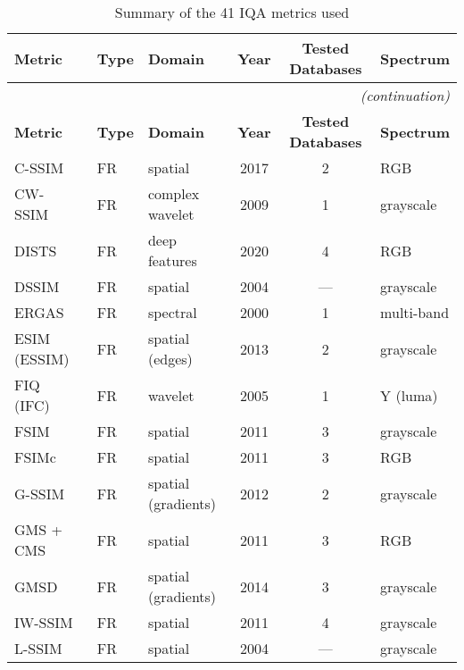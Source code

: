 \begin{longtable}{l l l c c l}
    \caption{Summary of the 41 IQA metrics used}\label{tab:fr_iqa_metrics}\\
    \hline
    \textbf{Metric} & \textbf{Type} & \textbf{Domain} & \textbf{Year} & \textbf{Tested Databases} & \textbf{Spectrum}\\
    \hline
    \endfirsthead
    \multicolumn{6}{r}{\small\itshape(continuation)}\\
    \hline
    \textbf{Metric} & \textbf{Type} & \textbf{Domain} & \textbf{Year} & \textbf{Tested Databases} & \textbf{Spectrum}\\
    \hline
    \endhead
    \hline
    \endfoot
    
    C-SSIM~\cite{Hassan2017CSSIM}          & FR   & spatial             & 2017 & 2    & RGB \\
    CW-SSIM~\cite{Sampat2009CWSSIM}        & FR   & complex wavelet     & 2009 & 1    & grayscale \\
    DISTS~\cite{Ding2020DISTS}             & FR   & deep features       & 2020 & 4    & RGB \\
    DSSIM~\cite{Wang2004SSIM}              & FR   & spatial             & 2004 & ---  & grayscale \\
    ERGAS~\cite{Ranchin2000ERGAS}          & FR   & spectral            & 2000 & 1    & multi-band \\
    ESIM (ESSIM)~\cite{Zhang2013ESSIM}     & FR   & spatial (edges)     & 2013 & 2    & grayscale \\
    FIQ (IFC)~\cite{Sheikh2005IFC}         & FR   & wavelet             & 2005 & 1    & Y (luma) \\
    FSIM~\cite{Zhang2011FSIM}              & FR   & spatial             & 2011 & 3    & grayscale \\
    FSIMc~\cite{Zhang2011FSIM}             & FR   & spatial             & 2011 & 3    & RGB \\
    G-SSIM~\cite{Liu2012GSSIM}             & FR   & spatial (gradients) & 2012 & 2    & grayscale \\
    GMS + CMS~\cite{Zhang2011FSIM}         & FR   & spatial             & 2011 & 3    & RGB \\
    GMSD~\cite{Xue2014GMSD}                & FR   & spatial (gradients) & 2014 & 3    & grayscale \\
    IW-SSIM~\cite{Li2011IWSSIM}            & FR   & spatial             & 2011 & 4    & grayscale \\
    L-SSIM~\cite{Wang2004SSIM}             & FR   & spatial             & 2004 & ---  & grayscale \\

\end{longtable}
